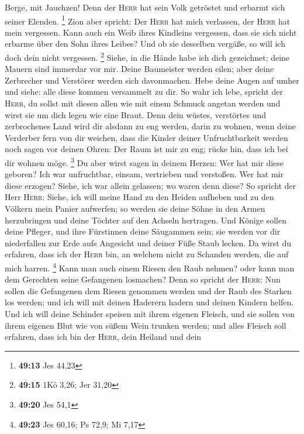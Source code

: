Berge, mit Jauchzen! Denn der \textsc{Herr} hat sein Volk getröstet und
erbarmt sich seiner Elenden. \footnote{\textbf{49:13} Jes 44,23}
 Zion aber spricht: Der \textsc{Herr} hat mich verlassen,
der \textsc{Herr} hat mein vergessen.  Kann auch ein Weib
ihres Kindleins vergessen, dass sie sich nicht erbarme über den Sohn
ihres Leibes? Und ob sie desselben vergäße, so will ich doch dein nicht
vergessen. \footnote{\textbf{49:15} 1Kö 3,26; Jer 31,20} 
Siehe, in die Hände habe ich dich gezeichnet; deine Mauern sind immerdar
vor mir.  Deine Baumeister werden eilen; aber deine
Zerbrecher und Verstörer werden sich davonmachen.  Hebe
deine Augen auf umher und siehe: alle diese kommen versammelt zu dir. So
wahr ich lebe, spricht der \textsc{Herr}, du sollst mit diesen allen wie
mit einem Schmuck angetan werden und wirst sie um dich legen wie eine
Braut.  Denn dein wüstes, verstörtes und zerbrochenes
Land wird dir alsdann zu eng werden, darin zu wohnen, wenn deine
Verderber fern von dir weichen,  dass die Kinder deiner
Unfruchtbarkeit werden noch sagen vor deinen Ohren: Der Raum ist mir zu
eng; rücke hin, dass ich bei dir wohnen möge. \footnote{\textbf{49:20}
  Jes 54,1}  Du aber wirst sagen in deinem Herzen: Wer
hat mir diese geboren? Ich war unfruchtbar, einsam, vertrieben und
verstoßen. Wer hat mir diese erzogen? Siehe, ich war allein gelassen; wo
waren denn diese?  So spricht der Herr \textsc{Herr}:
Siehe, ich will meine Hand zu den Heiden aufheben und zu den Völkern
mein Panier aufwerfen; so werden sie deine Söhne in den Armen
herzubringen und deine Töchter auf den Achseln hertragen.
 Und Könige sollen deine Pfleger, und ihre Fürstinnen
deine Säugammen sein; sie werden vor dir niederfallen zur Erde aufs
Angesicht und deiner Füße Staub lecken. Da wirst du erfahren, dass ich
der \textsc{Herr} bin, an welchem nicht zu Schanden werden, die auf mich
harren. \footnote{\textbf{49:23} Jes 60,16; Ps 72,9; Mi 7,17}
 Kann man auch einem Riesen den Raub nehmen? oder kann
man dem Gerechten seine Gefangenen losmachen?  Denn so
spricht der \textsc{Herr}: Nun sollen die Gefangenen dem Riesen genommen
werden und der Raub des Starken los werden; und ich will mit deinen
Haderern hadern und deinen Kindern helfen.  Und ich will
deine Schinder speisen mit ihrem eigenen Fleisch, und sie sollen von
ihrem eigenen Blut wie von süßem Wein trunken werden; und alles Fleisch
soll erfahren, dass ich bin der \textsc{Herr}, dein Heiland und dein
